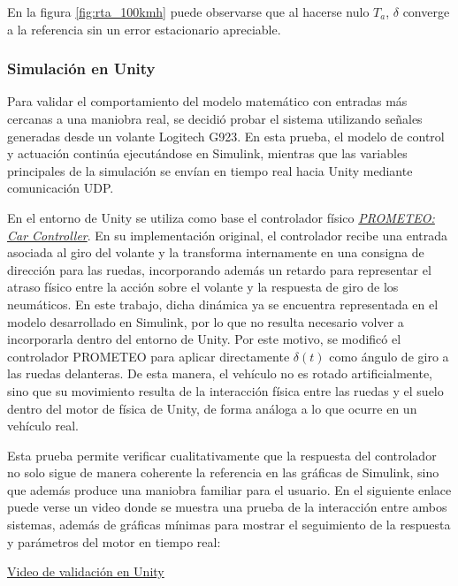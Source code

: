 \documentclass{article}
\begin{document}
En la figura \ref{fig:rta_100kmh} puede observarse que al hacerse nulo $T_a$, $\delta$ converge a la referencia sin un error estacionario apreciable. 

\subsubsection{Simulación en Unity}

Para validar el comportamiento del modelo matemático con entradas más cercanas a una maniobra real, se decidió probar el sistema utilizando señales generadas desde un volante Logitech G923. En esta prueba, el modelo de control y actuación continúa ejecutándose en Simulink, mientras que las variables principales de la simulación se envían en tiempo real hacia Unity mediante comunicación UDP.

En el entorno de Unity se utiliza como base el controlador físico \hyperlink{ref:prometeo-car-controller}{\textit{PROMETEO: Car Controller}}. En su implementación original, el controlador recibe una entrada asociada al giro del volante y la transforma internamente en una consigna de dirección para las ruedas, incorporando además un retardo para representar el atraso físico entre la acción sobre el volante y la respuesta de giro de los neumáticos. En este trabajo, dicha dinámica ya se encuentra representada en el modelo desarrollado en Simulink, por lo que no resulta necesario volver a incorporarla dentro del entorno de Unity. Por este motivo, se modificó el controlador PROMETEO para aplicar directamente $\delta(t)$ como ángulo de giro a las ruedas delanteras. De esta manera, el vehículo no es rotado artificialmente, sino que su movimiento resulta de la interacción física entre las ruedas y el suelo dentro del motor de física de Unity, de forma análoga a lo que ocurre en un vehículo real.

Esta prueba permite verificar cualitativamente que la respuesta del controlador no solo sigue de manera coherente la referencia en las gráficas de Simulink, sino que además produce una maniobra familiar para el usuario. En el siguiente enlace puede verse un video donde se muestra una prueba de la interacción entre ambos sistemas, además de gráficas mínimas para mostrar el seguimiento de la respuesta y parámetros del motor en tiempo real:

\begin{center}
\href{https://www.youtube.com/watch?v=QAsnqMuFXuQ}{Video de validación en Unity}
\end{center}
\end{document}
